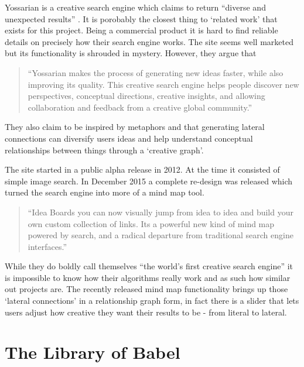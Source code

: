Yossarian is a creative search engine which claims to return ``diverse and unexpected results'' \autocite{Yossarian2015}. It is porobably the closest thing to `related work' that exists for this project. Being a commercial product it is hard to find reliable details on precisely how their search engine works. The site seems well marketed but its functionality is shrouded in mystery. However, they argue that

\begin{quote}
  ``Yossarian makes the process of generating new ideas faster, while also improving its quality. This creative search engine helps people discover new perspectives, conceptual directions, creative insights, and allowing collaboration and feedback from a creative global community.'' \autocite{Yossarian2015}
\end{quote}

They also claim to be inspired by metaphors and that generating lateral connections can diversify users ideas and help understand conceptual relationships between things through a `creative graph'.

The site started in a public alpha release in 2012. At the time it consisted of simple image search. In December 2015 a complete re-design was released \autocite{YossarianEmail} which turned the search engine into more of a mind map tool.

\begin{quote}
  ``Idea Boards you can now visually jump from idea to idea and build your own custom collection of links. Its a powerful new kind of mind map powered by search, and a radical departure from traditional search engine interfaces.'' \autocite{YossarianEmail}
\end{quote}

While they do boldly call themselves ``the world's first creative search engine'' \autocite{Yossarian2015} it is impossible to know how their algorithms really work and as such how similar out projects are. The recently released mind map functionality brings up those `lateral connections' in a relationship graph form, in fact there is a slider that lets users adjust how creative they want their results to be - from literal to lateral.



\section{The Library of Babel}

